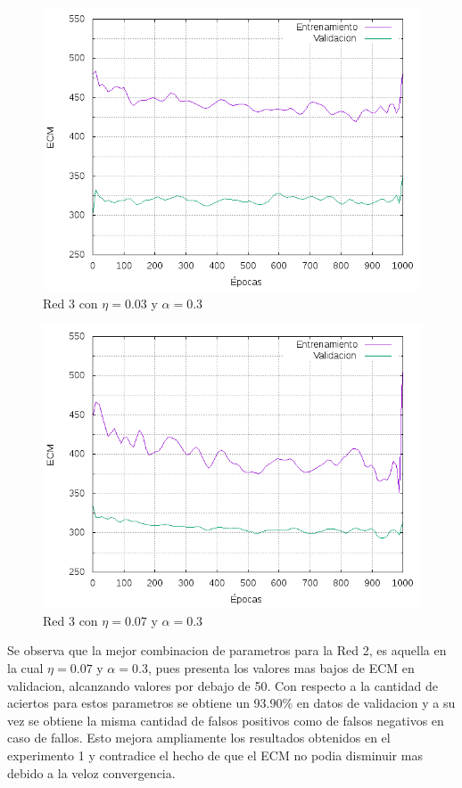 \begin{figure}[H]
  \includegraphics[width=125mm]{imagenes/ej1/ex_2-3_red_11-6-6-9-1_errors.png}
  \caption{Red 3 con $\eta = 0.03 $ y $ \alpha = 0.3$}
\end{figure}

\begin{figure}[H]
  \includegraphics[width=125mm]{imagenes/ej1/ex_2-4_red_11-6-6-9-1_errors.png}
  \caption{Red 3 con $\eta = 0.07 $ y $ \alpha = 0.3$}
\end{figure}



Se observa que la mejor combinacion de parametros para la Red 2, es aquella en la cual $\eta = 0.07$ y $\alpha = 0.3$, pues presenta los valores
mas bajos de ECM en validacion, alcanzando valores por debajo de 50. Con respecto a la cantidad de aciertos para estos parametros se obtiene un
93.90\% en datos de validacion y a su vez se obtiene la misma cantidad de falsos positivos como de falsos negativos en caso de fallos.
 Esto mejora ampliamente los resultados obtenidos en el experimento 1 y contradice el hecho de que el ECM no podia disminuir mas debido a la veloz
 convergencia.

